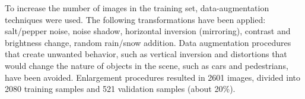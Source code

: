 To increase the number of images in the training set, data-augmentation techniques were used.
The following transformations have been applied: salt/pepper noise, noise shadow, horizontal inversion (mirroring), contrast and brightness change, random rain/snow addition.
Data augmentation procedures that create unwanted behavior, such as vertical inversion and distortions that would change the nature of objects in the scene, such as cars and pedestrians, have been avoided.
Enlargement procedures resulted in 2601 images, divided into 2080 training samples and 521 validation samples (about 20\%).

